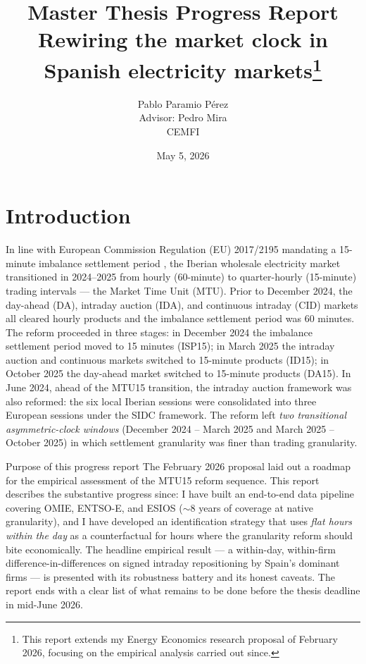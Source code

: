 \documentclass[11pt,a4paper]{article}
\title{\textbf{Master Thesis Progress Report}\\[3pt]
       \large Rewiring the market clock in Spanish electricity markets\thanks{This report extends my Energy Economics research proposal of February 2026, focusing on the empirical analysis carried out since.}}
\author{Pablo Paramio Pérez \\ Advisor: Pedro Mira \\ CEMFI}
\date{May 5, 2026}
\begin{document}
\maketitle

\section{Introduction}

In line with European Commission Regulation (EU) 2017/2195 mandating a 15-minute imbalance settlement period \citep{EC2017}, the Iberian wholesale electricity market transitioned in 2024--2025 from hourly (60-minute) to quarter-hourly (15-minute) trading intervals --- the Market Time Unit (MTU). Prior to December 2024, the day-ahead (DA), intraday auction (IDA), and continuous intraday (CID) markets all cleared hourly products and the imbalance settlement period was 60 minutes. The reform proceeded in three stages: in December 2024 the imbalance settlement period moved to 15 minutes (ISP15); in March 2025 the intraday auction and continuous markets switched to 15-minute products (ID15); in October 2025 the day-ahead market switched to 15-minute products (DA15). In June 2024, ahead of the MTU15 transition, the intraday auction framework was also reformed: the six local Iberian sessions were consolidated into three European sessions under the SIDC framework. The reform left \emph{two transitional asymmetric-clock windows} (December 2024 -- March 2025 and March 2025 -- October 2025) in which settlement granularity was finer than trading granularity.

\begin{purposebox}{Purpose of this progress report}
The February 2026 proposal laid out a roadmap for the empirical assessment of the MTU15 reform sequence. This report describes the substantive progress since: I have built an end-to-end data pipeline covering OMIE, ENTSO-E, and ESIOS (\(\sim\)8 years of coverage at native granularity), and I have developed an identification strategy that uses \emph{flat hours within the day} as a counterfactual for hours where the granularity reform should bite economically. The headline empirical result --- a within-day, within-firm difference-in-differences on signed intraday repositioning by Spain's dominant firms --- is presented with its robustness battery and its honest caveats. The report ends with a clear list of what remains to be done before the thesis deadline in mid-June 2026.
\end{purposebox}
\end{document}
